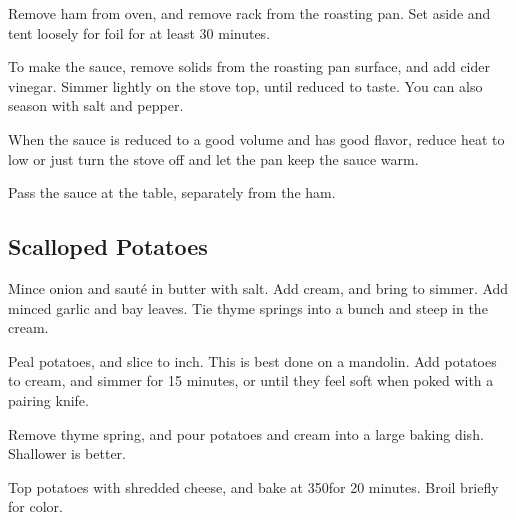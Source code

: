 \begin{recipe}
Remove ham from oven, and remove rack from the roasting pan. Set aside and tent loosely for foil for at least 30 minutes.

To make the sauce, remove solids from the roasting pan surface, and add cider vinegar. Simmer lightly on the stove top, until reduced to taste. You can also season with salt and pepper.

When the sauce is reduced to a good volume and has good flavor, reduce heat to low or just turn the stove off and let the pan keep the sauce warm.

Pass the sauce at the table, separately from the ham.

\subsection{Scalloped Potatoes}



Mince onion and sauté in butter with salt. Add cream, and bring to simmer. Add minced garlic and bay leaves. Tie thyme springs into a bunch and steep in the cream.


Peal potatoes, and slice to  inch. This is best done on a mandolin. Add potatoes to cream, and simmer for 15 minutes, or until they feel soft when poked with a pairing knife.

Remove thyme spring, and pour potatoes and cream into a large baking dish. Shallower is better.


Top potatoes with shredded cheese, and bake at 350\degree for 20 minutes. Broil briefly for color.

\end{recipe}

